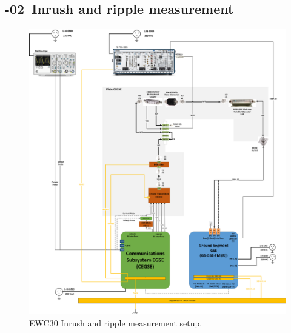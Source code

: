 \setcounter{Sec}{0}\setcounter{Step}{0}

\newpage
\renewcommand{\subprocid}{{\procid}-02}

\newpage
\subsection{\subprocid \ Inrush and ripple measurement }


\begin{figure}[H]
	\centering
	  \includegraphics[width=.9\linewidth]{figuras/EWC30PXISetupA.png}  
	  \caption{EWC30 Inrush and ripple measurement setup.}
	\label{fig:setup_xband_funcional_ripple}
	\end{figure}
\newpage
